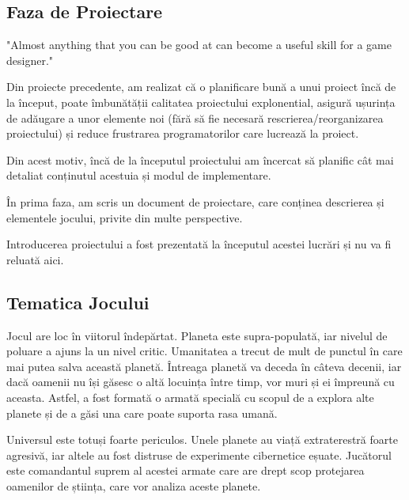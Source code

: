 \documentclass[12pt, a4paper]{article}
\begin{document}
	\subsection{Faza de Proiectare}
	
	"Almost anything that you can be good at can become a useful skill for a game designer." \cite{bookOfLenses}
	\newline
	
	Din proiecte precedente, am realizat că o planificare bună a unui proiect încă de la început, poate îmbunătății calitatea proiectului explonential, asigură ușurința de adăugare a unor elemente noi (fără să fie necesară rescrierea/reorganizarea proiectului) și reduce frustrarea programatorilor care lucrează la proiect.
	\newline
	
	Din acest motiv, încă de la începutul proiectului am încercat să planific cât mai detaliat conținutul acestuia și modul de implementare.
	\newline
	
	În prima faza, am scris un document de proiectare, care conținea descrierea și elementele jocului, privite din multe perspective.
	\newline
	
	Introducerea proiectului a fost prezentată la începutul acestei lucrări și nu va fi reluată aici.
	
	
	
	
	
	\subsection{Tematica Jocului}
	\label{section: gamePlot}
	
	Jocul are loc în viitorul îndepărtat. Planeta este supra-populată, iar nivelul de poluare a ajuns la un nivel critic. Umanitatea a trecut de mult de punctul în care mai putea salva această planetă. Întreaga planetă va deceda în câteva decenii, iar dacă oamenii nu își găsesc o altă locuința între timp, vor muri și ei împreună cu aceasta. Astfel, a fost formată o armată specială cu scopul de a explora alte planete și de a găsi una care poate suporta rasa umană.
	\newline
	
	Universul este totuși foarte periculos. Unele planete au viață extraterestră foarte agresivă, iar altele au fost distruse de experimente cibernetice eșuate. Jucătorul este comandantul suprem al acestei armate care are drept scop protejarea oamenilor de știința, care vor analiza aceste planete.
	\newline
	
\end{document}
